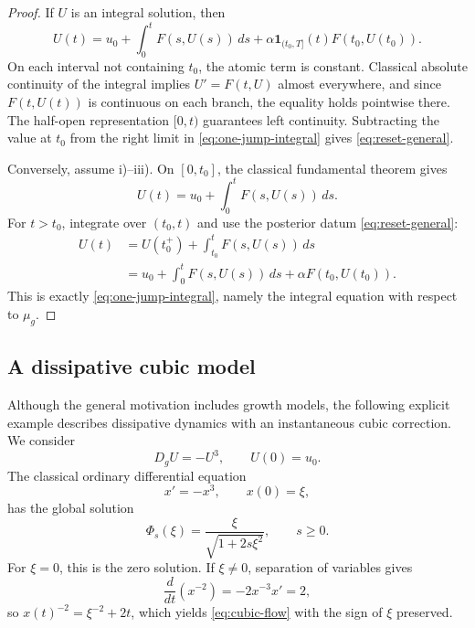 \documentclass[preprint,12pt]{elsarticle}
\theoremstyle{definition}
\theoremstyle{remark}
\newcommand{\mug}{\mu_g}
\newcommand{\ind}{\mathbf 1}
\begin{document}
\begin{proof}
If $U$ is an integral solution, then
\begin{equation}\label{eq:one-jump-integral}
 U(t)=u_0+\int_0^tF(s,U(s))\,ds
 +\alpha\ind_{(t_0,T]}(t)F(t_0,U(t_0)).
\end{equation}
On each interval not containing $t_0$, the atomic term is constant. Classical absolute continuity of the integral implies $U'=F(t,U)$ almost everywhere, and since $F(t,U(t))$ is continuous on each branch, the equality holds pointwise there. The half-open representation $[0,t)$ guarantees left continuity. Subtracting the value at $t_0$ from the right limit in \eqref{eq:one-jump-integral} gives \eqref{eq:reset-general}.

Conversely, assume i)--iii). On $[0,t_0]$, the classical fundamental theorem gives
\[
 U(t)=u_0+\int_0^tF(s,U(s))\,ds.
\]
For $t>t_0$, integrate over $(t_0,t)$ and use the posterior datum \eqref{eq:reset-general}:
\begin{align*}
 U(t)
 &=U(t_0^+)+\int_{t_0}^tF(s,U(s))\,ds\\
 &=u_0+\int_0^tF(s,U(s))\,ds
 +\alpha F(t_0,U(t_0)).
\end{align*}
This is exactly \eqref{eq:one-jump-integral}, namely the integral equation with respect to $\mug$.
\end{proof}

\subsection{A dissipative cubic model}

Although the general motivation includes growth models, the following explicit example describes dissipative dynamics with an instantaneous cubic correction. We consider
\begin{equation}\label{eq:cubic-model}
 D_gU=-U^3,
 \qquad U(0)=u_0.
\end{equation}
The classical ordinary differential equation
\begin{equation}\label{eq:cubic-classical}
 x'=-x^3,
 \qquad x(0)=\xi,
\end{equation}
has the global solution
\begin{equation}\label{eq:cubic-flow}
 \Phi_s(\xi)=\frac{\xi}{\sqrt{1+2s\xi^2}},\qquad s\ge0.
\end{equation}
For $\xi=0$, this is the zero solution. If $\xi\ne0$, separation of variables gives
\[
 \frac{d}{dt}(x^{-2})=-2x^{-3}x'=2,
\]
so $x(t)^{-2}=\xi^{-2}+2t$, which yields \eqref{eq:cubic-flow} with the sign of $\xi$ preserved.
\end{document}
